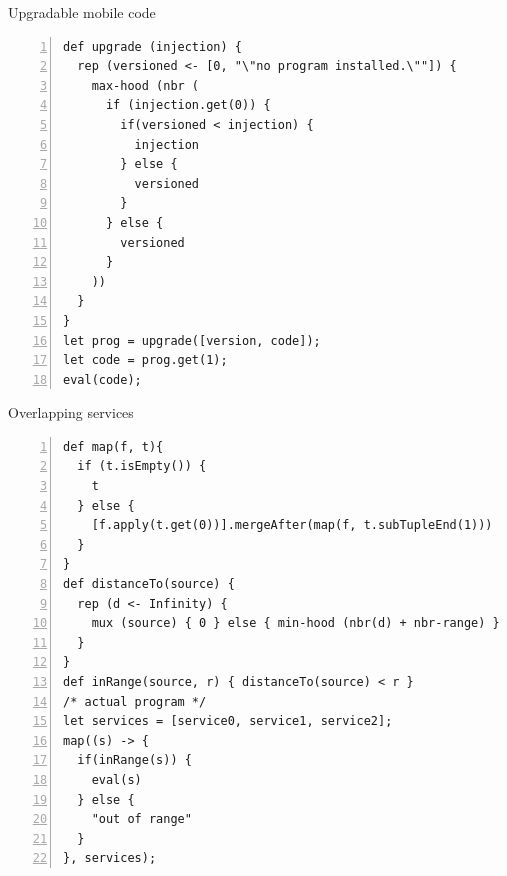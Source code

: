 \documentclass[presentation]{beamer}\mode<presentation>{\usetheme{sapere}}
\begin{document}
\begin{frame}[fragile]{Upgradable mobile code}
  \scriptsize
    \begin{lstlisting}[mathescape,morekeywords={import,as,def,if,rep,mux,sense,inf,let,eval,max,def,min,hood,nbr,nbr,range,else,Infinity},numbers=left,basicstyle=\ttfamily]
def upgrade (injection) {
  rep (versioned <- [0, "\"no program installed.\""]) {
    max-hood (nbr (
      if (injection.get(0)) {
        if(versioned < injection) { 
          injection
        } else {
          versioned
        }
      } else {
        versioned
      }
    ))
  }
}
let prog = upgrade([version, code]);
let code = prog.get(1);
eval(code);
    \end{lstlisting}
\end{frame}

\begin{frame}[fragile]{Overlapping services}
  \scriptsize
    \begin{lstlisting}[mathescape,morekeywords={import,as,def,if,rep,mux,sense,inf,let,eval,max,def,min,hood,nbr,nbr,range,else,Infinity},numbers=left,basicstyle=\ttfamily]
def map(f, t){
  if (t.isEmpty()) {
    t
  } else {
    [f.apply(t.get(0))].mergeAfter(map(f, t.subTupleEnd(1)))
  }
}
def distanceTo(source) {
  rep (d <- Infinity) {
    mux (source) { 0 } else { min-hood (nbr(d) + nbr-range) }
  }
}
def inRange(source, r) { distanceTo(source) < r }
/* actual program */
let services = [service0, service1, service2];
map((s) -> {
  if(inRange(s)) {
    eval(s)
  } else {
    "out of range"
  }
}, services);
\end{lstlisting}
\end{frame}
\end{document}
